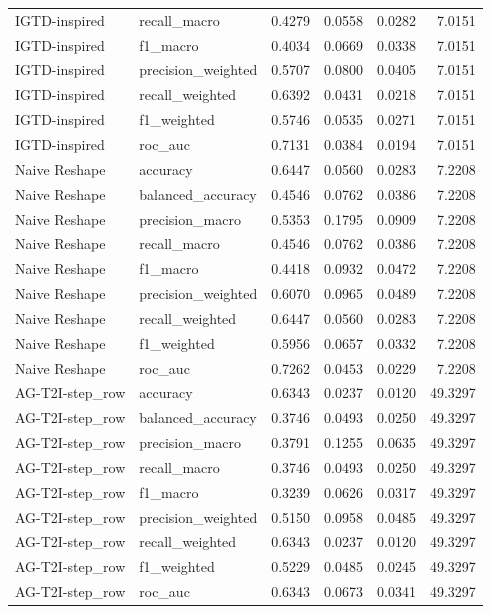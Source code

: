 \begin{tabular}{llrrrr}
IGTD-inspired & recall_macro & 0.4279 & 0.0558 & 0.0282 & 7.0151 \\
IGTD-inspired & f1_macro & 0.4034 & 0.0669 & 0.0338 & 7.0151 \\
IGTD-inspired & precision_weighted & 0.5707 & 0.0800 & 0.0405 & 7.0151 \\
IGTD-inspired & recall_weighted & 0.6392 & 0.0431 & 0.0218 & 7.0151 \\
IGTD-inspired & f1_weighted & 0.5746 & 0.0535 & 0.0271 & 7.0151 \\
IGTD-inspired & roc_auc & 0.7131 & 0.0384 & 0.0194 & 7.0151 \\
Naive Reshape & accuracy & 0.6447 & 0.0560 & 0.0283 & 7.2208 \\
Naive Reshape & balanced_accuracy & 0.4546 & 0.0762 & 0.0386 & 7.2208 \\
Naive Reshape & precision_macro & 0.5353 & 0.1795 & 0.0909 & 7.2208 \\
Naive Reshape & recall_macro & 0.4546 & 0.0762 & 0.0386 & 7.2208 \\
Naive Reshape & f1_macro & 0.4418 & 0.0932 & 0.0472 & 7.2208 \\
Naive Reshape & precision_weighted & 0.6070 & 0.0965 & 0.0489 & 7.2208 \\
Naive Reshape & recall_weighted & 0.6447 & 0.0560 & 0.0283 & 7.2208 \\
Naive Reshape & f1_weighted & 0.5956 & 0.0657 & 0.0332 & 7.2208 \\
Naive Reshape & roc_auc & 0.7262 & 0.0453 & 0.0229 & 7.2208 \\
AG-T2I-step_row & accuracy & 0.6343 & 0.0237 & 0.0120 & 49.3297 \\
AG-T2I-step_row & balanced_accuracy & 0.3746 & 0.0493 & 0.0250 & 49.3297 \\
AG-T2I-step_row & precision_macro & 0.3791 & 0.1255 & 0.0635 & 49.3297 \\
AG-T2I-step_row & recall_macro & 0.3746 & 0.0493 & 0.0250 & 49.3297 \\
AG-T2I-step_row & f1_macro & 0.3239 & 0.0626 & 0.0317 & 49.3297 \\
AG-T2I-step_row & precision_weighted & 0.5150 & 0.0958 & 0.0485 & 49.3297 \\
AG-T2I-step_row & recall_weighted & 0.6343 & 0.0237 & 0.0120 & 49.3297 \\
AG-T2I-step_row & f1_weighted & 0.5229 & 0.0485 & 0.0245 & 49.3297 \\
AG-T2I-step_row & roc_auc & 0.6343 & 0.0673 & 0.0341 & 49.3297 \\

\end{tabular}
